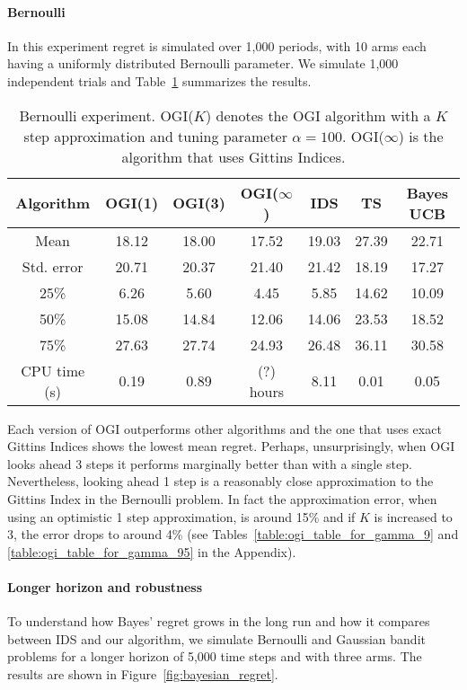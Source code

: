 \paragraph{Bernoulli}
In this experiment regret is simulated over 1,000 periods, with 10 arms each having a uniformly distributed Bernoulli parameter. We simulate 1,000 independent trials and Table~\ref{table:bernoulli_experiment1} summarizes the results.

\begin{table}[h!]
	\centering
	\begin{tabular}{ccccccc} \toprule
		\textbf{Algorithm} & \textbf{OGI(1)} & \textbf{OGI(3)} &  \textbf{OGI($\infty$)} & \textbf{IDS} & \textbf{TS} & \textbf{Bayes UCB}  \\ \midrule
		Mean &  18.12 & 18.00 & 17.52 & 19.03 & 27.39 & 22.71 \\ 
		Std. error & 20.71 & 20.37 &  21.40 & 21.42 & 18.19 & 17.27 \\ 
		25\% & 6.26 & 5.60 & 4.45 & 5.85 & 14.62 & 10.09 \\
		50\% & 15.08 & 14.84 &12.06 & 14.06 & 23.53 & 18.52 \\
		75\% & 27.63 & 27.74 & 24.93 & 26.48 & 36.11 & 30.58 \\
		CPU time (s) & 0.19 & 0.89 & (?) hours & 8.11 & 0.01 & 0.05  \\ \bottomrule
	\end{tabular}
	\caption[Table caption text]{Bernoulli experiment. OGI($K$) denotes the OGI algorithm with a $K$ step approximation and tuning parameter $\alpha = 100$. OGI($\infty$) is the algorithm that uses Gittins Indices.}
	\label{table:bernoulli_experiment1}
\end{table}
Each version of OGI outperforms other algorithms and the one that uses exact Gittins Indices shows the lowest mean regret. Perhaps, unsurprisingly, when OGI  looks ahead 3 steps it performs marginally better than with a single step. Nevertheless, looking ahead 1 step is a reasonably close approximation to the Gittins Index in the Bernoulli problem. In fact the approximation error, when using an optimistic 1 step approximation, is around 15\% and if $K$ is increased to 3, the error drops to around 4\% (see Tables~\ref{table:ogi_table_for_gamma_9} and \ref{table:ogi_table_for_gamma_95} in the Appendix).


\paragraph{Longer horizon and robustness}
To understand how Bayes' regret grows in the long run and how it compares between IDS and our algorithm, we simulate Bernoulli and Gaussian bandit problems for a longer horizon of 5,000 time steps and with three arms. The results are shown in Figure~\ref{fig:bayesian_regret}.

